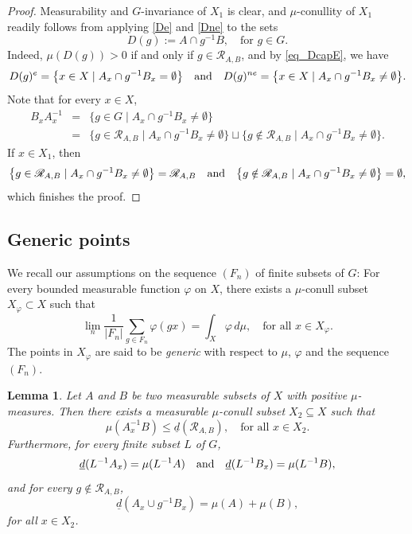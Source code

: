 \documentclass[JEP,XML,SOM,Unicode]{cedram}
\let\mathcal\mathscr
\newcommand{\cR}{\mathcal{R}}
\newcommand{\qand}{\quad\textup{and}\quad}
\theoremstyle{plain}
\newtheorem{lemma}[theorem]{Lemma}
\theoremstyle{definition}
\begin{document}
\begin{proof}
Measurability and $G$-invariance of $X_1$ is clear, and $\mu$-conullity of $X_1$ readily follows from applying \eqref{De} and \eqref{Dne} to the sets
\[
D(g) := A \cap g^{-1}B, \quad \textrm{for $g \in G$}.
\]
Indeed, $\mu(D(g)) > 0$ if and only if $g \in \cR_{A,B}$, and by \eqref{eq_DcapE}, we have
\[
D(g)^{e} = \bigl\{ x \in X \mid  A_x \cap g^{-1} B_x = \emptyset \bigr\}
\qand
D(g)^{ne} = \bigl\{ x \in X \mid  A_x \cap g^{-1}B_x \neq \emptyset \bigr\}.
\]
Note that for every $x \in X$,
\begin{eqnarray*}
B_x A^{-1}_x
&=&
\bigl\{ g \in G \mid  A_x \cap g^{-1} B_x \neq \emptyset \bigr\} \\[2pt]
&=&
\bigl\{ g \in \cR_{A,B} \mid  A_x \cap g^{-1} B_x \neq \emptyset \bigr\} \sqcup \bigl\{ g \notin \cR_{A,B} \mid  A_x \cap g^{-1} B_x \neq \emptyset \bigr\}.
\end{eqnarray*}
If $x \in X_1$, then
\[
\bigl\{ g \in \cR_{A,B} \mid  A_x \cap g^{-1} B_x \neq \emptyset \bigr\} = \cR_{A,B}
\qand
\bigl\{ g \notin \cR_{A,B} \mid  A_x \cap g^{-1} B_x \neq \emptyset \bigr\} = \emptyset,
\]
which finishes the proof.
\end{proof}

\subsection{Generic points}

We recall our assumptions on the sequence $(F_n)$ of finite subsets of $G$: For every bounded measurable function $\varphi$ on $X$,
there exists a $\mu$-conull subset $X_\varphi \subset X$ such that
\[
\lim_n \frac{1}{|F_n|} \sum_{g \in F_n} \varphi(gx) = \int_X \varphi \, d\mu, \quad \textrm{for all $x \in X_\varphi$}.
\]
The points in $X_\varphi$ are said to be \emph{generic} with respect to $\mu$, $\varphi$ and the sequence $(F_n)$.
\begin{lemma}
\label{lemma_generic}
Let $A$ and $B$ be two measurable subsets of $X$ with positive $\mu$-measures. Then there exists a measurable $\mu$-conull subset $X_2 \subseteq X$
such that
\[
\mu(A_x^{-1}B) \leq \underline{d}(\cR_{A,B}), \quad \textrm{for all $x \in X_2$}.
\]
Furthermore, for every finite subset $L$ of $G$,
\[
\underline{d}(L^{-1}A_x) = \mu(L^{-1}A) \qand \underline{d}(L^{-1}B_x) = \mu(L^{-1}B),
\]
and for every $g \notin \cR_{A,B}$,
\[
\underline{d}(A_x \cup g^{-1}B_x) = \mu(A) + \mu(B),
\]
for all $x \in X_2$.
\end{lemma}
\end{document}
